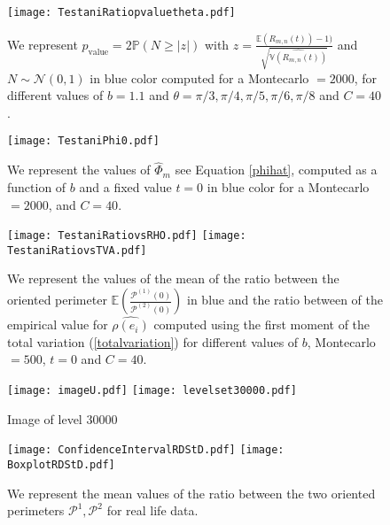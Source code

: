 \documentclass[12pt]{article}
\renewcommand{\hat}{\widehat}
\theoremstyle{Theorem}
\begin{document}
\begin{figure}[H]
  \centering
    {\texttt{[image: TestaniRatiopvaluetheta.pdf]}}
    \hspace{0.2cm} 
 \caption{We represent $p_{\text{value}} = 2\mathbb{P}\left(N \geq |z|\right)$ with $z = \frac{\mathbb{E}\left(R_{m,n}(t)\right) - 1)}{\sqrt{\hat{\mathbb{V}\left(R_{m, n}(t)\right)}}}$ and $N \sim \mathcal{N}(0,1)$ in blue color computed for a Montecarlo $= 2000$, for different values of $b = 1.1$ and $\theta = \pi/3, \pi/4, \pi/5, \pi/6, \pi/8 $ and $C = 40$.}
\label{fig2}
\end{figure}

\begin{figure}[H]
  \centering
    {\texttt{[image: TestaniPhi0.pdf]}}
    \hspace{0.2cm} 
 \caption{We represent the values of $\hat{\Phi}_{m}$ see Equation \eqref{phihat}, computed as a function of $b$ and a fixed value $t=0$ in blue color for a Montecarlo $= 2000$, and $C = 40$.}
\label{fig2}
\end{figure}

\begin{figure}[H]
  \centering
    {\texttt{[image: TestaniRatiovsRHO.pdf]}}
    {\texttt{[image: TestaniRatiovsTVA.pdf]}}
    \hspace{0.2cm} 
 \caption{We represent the values of the mean of the ratio between the oriented perimeter $\mathbb{E}\left(\frac{\mathcal{P}^{(1)}(0)}{\mathcal{P}^{(2)}(0)}\right)$ in blue and the ratio between of the empirical value for $\hat{\rho(e_i)}$ computed using the first moment of the total variation (\ref{totalvariation}) for different values of $b$, Montecarlo $= 500$, $t = 0$ and $C = 40$.}
\label{fig2}
\end{figure}


\begin{figure}[H]
  \centering
    {\texttt{[image: imageU.pdf]}}
    \hspace{3cm}
    {\texttt{[image: levelset30000.pdf]}}
    \hspace{0.2cm}
 \caption{ Image of level $30000$}
\label{fig2}
\end{figure}

\begin{figure}[H]
  \centering
    {\texttt{[image: ConfidenceIntervalRDStD.pdf]}}
    {\texttt{[image: BoxplotRDStD.pdf]}}
    \hspace{0.2cm}
 \caption{We represent the mean values of the ratio between the two oriented perimeters $\mathcal{P}^{1}, \mathcal{P}^{2}$ for real life data.}
\label{fig2}
\end{figure}
\end{document}
